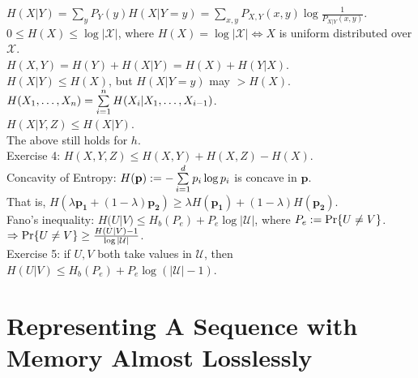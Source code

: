 $H(X|Y)=\sum_yP_Y(y)H(X|Y=y)=\sum_{x, y}P_{X, Y}(x, y)\log\frac1{P_{X|Y}(x, y)}$.\\
$0\leq H(X)\leq\log|\mathcal{X}|$, where $H(X)=\log|\mathcal{X}|\iff X$ is uniform distributed over $\mathcal{X}$.\\
$H(X, Y)=H(Y)+H(X|Y)=H(X)+H(Y|X)$.\\
$H(X|Y)\leq H(X)$, but $H(X|Y=y)$ may $>H(X)$.\\
$H(X_1, \dots, X_n)=\suml_{i=1}^nH(X_i|X_1, \dots, X_{i-1})$.\\
$H(X|Y, Z)\leq H(X|Y)$.\\
The above still holds for $h$.\\
Exercise 4: $H(X, Y, Z)\leq H(X, Y)+H(X, Z)-H(X)$.\\
Concavity of Entropy: $H(\mathbf{p}):=-\suml_{i=1}^dp_i\log p_i$ is concave in $\mathbf{p}$.\\
That is, $H(\lambda\mathbf{p_1}+(1-\lambda)\mathbf{p_2})\geq\lambda H(\mathbf{p_1})+(1-\lambda)H(\mathbf{p_2})$.\\
Fano's inequality: $H(U|V)\leq H_b(P_e)+P_e\log|\mathcal{U}|$, where $P_e:=\P\{U\neq V\}$.\\
$\then\P\{U\neq V\}\geq\frac{H(U|V)-1}{\log|\mathcal{U}|}$.\\
Exercise 5: if $U, V$ both take values in $\mathcal{U}$, then $H(U|V)\leq H_b(P_e)+P_e\log(|\mathcal{U}|-1)$.

\section{Representing A Sequence with Memory Almost Losslessly}

